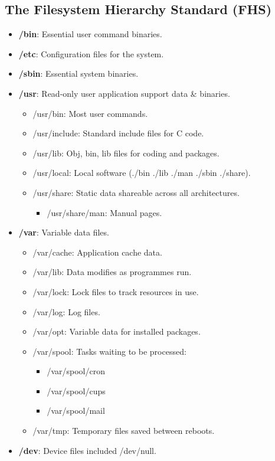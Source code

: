 \documentclass[11pt,a4paper]{article}
\begin{document}
\newpage
\subsection{The Filesystem Hierarchy Standard (FHS)}
\begin{itemize}
\item \textbf{/bin}: Essential user command binaries.
\item \textbf{/etc}: Configuration files for the system.
\item \textbf{/sbin}: Essential system binaries.
\item \textbf{/usr}: Read-only user application support data \& binaries.
\begin{itemize}
\item /usr/bin: Most user commands.
\item /usr/include: Standard include files for C code.
\item /usr/lib: Obj, bin, lib files for coding and packages.
\item /usr/local: Local software (./bin ./lib ./man ./sbin ./share).
\item /usr/share: Static data shareable across all architectures.
\begin{itemize}
\item /usr/share/man: Manual pages.
\end{itemize}
\end{itemize}
\item \textbf{/var}: Variable data files.
\begin{itemize}
\item /var/cache: Application cache data.
\item /var/lib: Data modifies as programmes run.
\item /var/lock: Lock files to track resources in use.
\item /var/log: Log files.
\item /var/opt: Variable data for installed packages.
\item /var/spool: Tasks waiting to be processed:
\begin{itemize}
\item /var/spool/cron
\item /var/spool/cups
\item /var/spool/mail
\end{itemize}
\item /var/tmp: Temporary files saved between reboots.
\end{itemize}
\item \textbf{/dev}: Device files included /dev/null.

\end{itemize}
\end{document}
